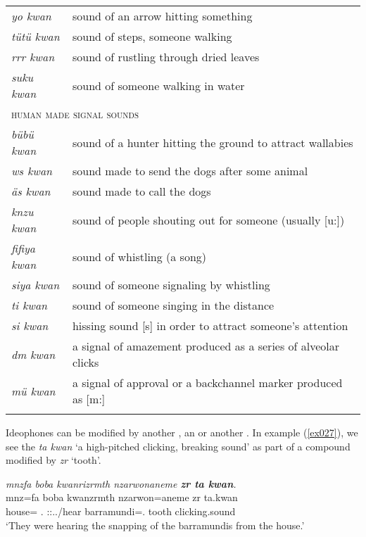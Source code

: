 {\begin{table}
\begin{tabularx}{\textwidth}{Xl}
		\emph{yo kwan}&sound of an arrow hitting something\\
		\emph{tütü kwan}&sound of steps, someone walking\\
		\emph{rrr kwan}&sound of rustling through dried leaves\\
		\emph{suku kwan}&sound of someone walking in water\\
		\multicolumn{2}{l}{\textsc{human made signal sounds}}\\ \midrule
		\emph{bübü kwan}&sound of a hunter hitting the ground to attract wallabies\\
		\emph{ws kwan}&sound made to send the dogs after some animal\\
		\emph{äs kwan}&sound made to call the dogs\\
		\emph{knzu kwan}&sound of people shouting out for someone (usually [u:])\\
		\emph{fifiya kwan}&sound of whistling (a song)\\
		\emph{siya kwan}&sound of someone signaling by whistling\\
		\emph{ti kwan}&sound of someone singing in the distance\\
		\emph{si kwan}&hissing sound [s] in order to attract someone's attention\\
		\emph{dm kwan}&a signal of amazement produced as a series of alveolar clicks\\
		\emph{mü kwan}&a signal of approval or a backchannel marker produced as [m:]\\
		\lspbottomrule
	\end{tabularx}
\end{table}}%

Ideophones can be modified by another , an  or another . In example (\ref{ex027}), we see the  \emph{ta kwan} `a high-pitched clicking, breaking sound' as part of a compound modified by \emph{zr} `tooth'.

\begin{exe}
	\ex \emph{mnzfa boba kwanrizrmth nzarwonaneme \textbf{zr ta kwan}.}\\
	\gll mnz=fa boba kwanzrmth nzarwon=aneme zr ta.kwan\\
	house=\Abl{} \Med{}.\Abl{} \Stpl:\Sbj:\Pst.\Dur.\Venit/hear barramundi=\Poss{}.\Nsg{} tooth {clicking.sound}\\
	\trans `They were hearing the snapping of the barramundis from the house.'\\ 
	\label{ex027}
\end{exe}

